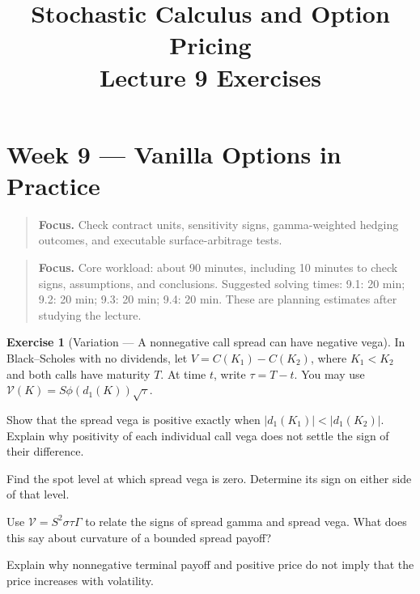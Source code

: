 \documentclass[11pt]{article}
\title{Stochastic Calculus and Option Pricing\\Lecture 9 Exercises}
\author{}
\date{}
\theoremstyle{definition}
\newtheorem{exercise}{Exercise}[section]
\newcommand{\lecturesummary}[1]{\begin{quote}\small\textbf{Focus.} #1\end{quote}}
\begin{document}
\maketitle
\vspace{-1.2em}
\setcounter{section}{8}
\fi

\section{Week 9 --- Vanilla Options in Practice}
\lecturesummary{Check contract units, sensitivity signs, gamma-weighted hedging outcomes, and executable surface-arbitrage tests.}

\ifIncludeCore

\lecturesummary{Core workload: about 90 minutes, including 10 minutes to check signs, assumptions, and conclusions. Suggested solving times: 9.1: 20 min; 9.2: 20 min; 9.3: 20 min; 9.4: 20 min. These are planning estimates after studying the lecture.}
\setcounter{exercise}{0}
\begin{exercise}[Variation --- A nonnegative call spread can have negative vega]
In Black--Scholes with no dividends, let
\(V=C(K_1)-C(K_2)\), where \(K_1<K_2\) and both calls have maturity
\(T\). At time \(t\), write \(\tau=T-t\). You may use
\(\mathcal V(K)=S\phi(d_1(K))\sqrt\tau\).
\begin{exparts}
\item Show that the spread vega is positive exactly when \(|d_1(K_1)|<|d_1(K_2)|\). Explain why positivity of each individual call vega does not settle the sign of their difference.
\item Find the spot level at which spread vega is zero. Determine its sign on either side of that level.
\item Use \(\mathcal V=S^2\sigma\tau\Gamma\) to relate the signs of spread gamma and spread vega. What does this say about curvature of a bounded spread payoff?
\item Explain why nonnegative terminal payoff and positive price do not imply that the price increases with volatility.
\end{exparts}
\end{exercise}
\end{document}
